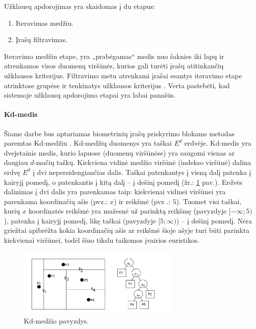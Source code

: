 
Užklausų apdorojimas yra skaidomas į du etapus:
\begin{enumerate}
	\item Iteravimas medžiu.
	\item Įrašų filtravimas.
\end{enumerate}
Iteravimo medžiu etape, yra „prabėgamas“ medis nuo šaknies iki lapų ir atrenkamos visos duomenų viršūnės, kurios gali turėti įrašų atitinkančių užklausos kriterijus.
Filtravimo metu atrenkami įrašai esantys iteravimo etape atrinktose grupėse ir tenkinatys užklausos kriterijus \cite{brinkhoff1994multi} \cite{bohm2001searching}.
Verta pastebėti, kad sistemoje \cite{NeurotechnologyMegamatcherAccelerator} užklausų apdorojimo etapai yra labai panašūs.

\paragraph{Kd-medis}

Šiame darbe bus aptariamas biometrinių įrašų priskyrimo blokams metodas paremtas Kd-medžiu \cite{bentley1979multidimensional}.
Kd-medžių duomenys yra taškai $E^d$ erdvėje.
Kd-medis yra dvejetainis medis, kurio lapuose (duomenų viršūnėse) yra saugomi vienas ar daugiau $d$-mačių taškų.
Kiekviena vidinė medžio viršūnė (indekso viršūnė) dalina erdvę $E^d$ į dvi nepersidengiančias dalis.
Taškai patenkantys į vieną dalį patenka į kairyjį pomedį, o patenkantis į kitą dalį -- į dešinį pomedį (žr.: \ref{img:KdTreeExample} pav.).
Erdvės dalinimas į dvi dalis yra parenkamas taip: kiekvienai vidinei viršūnei yra parenkama koordinačių ašis (pvz.: $x$) ir reikšmė (pvz .: $5$).
Tuomet visi taškai, kurių $x$ koordinatės reikšmė yra mažesnė už parinktą reikšmę (pavyzdyje $[-\infty; 5)$), patenka į kairyjį pomedį, likę taškai (pavyzdyje $[5; \infty)$) -- į dešinį pomedį.
Nėra griežtai apibrėžta kokia koordinačių ašis ar reikšmė šioje ašyje turi būti parinkta kiekvienai viršūnei, todėl šiuo tikslu taikomos įvairios euristikos.

\begin{figure}[H]
\begin{center}
\includegraphics[width=0.7\textwidth]{img/KdTreeExample.png}
\caption{Kd-medžio pavyzdys.}
\label{img:KdTreeExample}
\end{center}
\end{figure}

